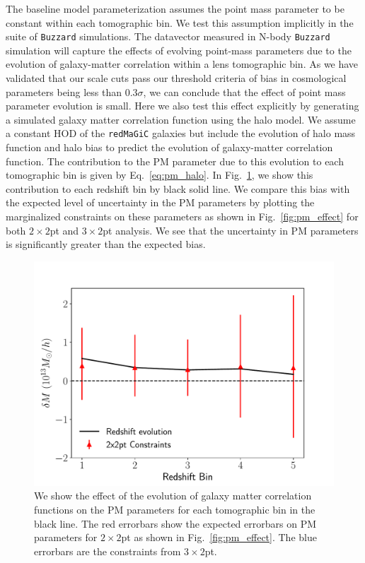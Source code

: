 \documentclass[fleqn,usenatbib]{mnras}
\newcommand{\redmagic}{\texttt{redMaGiC} }
\newcommand{\buzzard}{\texttt{Buzzard} }
\begin{document}
The baseline model parameterization assumes the point mass parameter to be constant within each tomographic bin. We test this assumption implicitly in the suite of \buzzard simulations. The datavector measured in N-body \buzzard simulation will capture the effects of evolving point-mass parameters due to the evolution of galaxy-matter correlation within a lens tomographic bin. As we have validated that our scale cuts pass our threshold criteria of bias in cosmological parameters being less than 0.3$\sigma$, we can conclude that the effect of point mass parameter evolution is small. Here we also test this effect explicitly by generating a simulated galaxy matter correlation function using the halo model. We assume a constant HOD of the \redmagic galaxies but include the evolution of halo mass function and halo bias to predict the evolution of galaxy-matter correlation function. The contribution to the PM parameter due to this evolution to each tomographic bin is given by Eq.~\ref{eq:pm_halo}. In Fig.~\ref{fig:pm_evolve}, we show this contribution to each redshift bin by black solid line. We compare this bias with the expected level of uncertainty in the PM parameters by plotting the marginalized constraints on these parameters as shown in Fig.~\ref{fig:pm_effect} for both $2\times2$pt and $3\times2$pt analysis. We see that the uncertainty in PM parameters is significantly greater than the expected bias. 


\begin{figure}
\includegraphics[width=\columnwidth]{figs/PM_evolve_impact.pdf}
\caption[]{We show the effect of the evolution of galaxy matter correlation functions on the PM parameters for each tomographic bin in the black line. The red errorbars show the expected errorbars on PM parameters for $2\times2$pt as shown in Fig.~\ref{fig:pm_effect}. The blue errorbars are the constraints from $3\times2$pt.
}
\label{fig:pm_evolve}
\end{figure}
\end{document}
